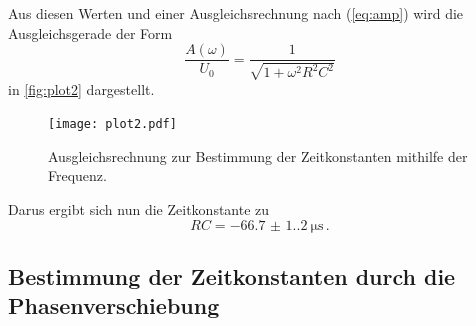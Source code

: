 Aus diesen Werten und einer Ausgleichsrechnung nach (\ref{eq:amp}) wird die Ausgleichsgerade der Form
\begin{equation*}
  \frac{A(\omega)}{U_{0}}=\frac{1}{\sqrt{1+\omega^{2} R^{2} C^{2}}}
\end{equation*}
in \autoref{fig:plot2} dargestellt.
\begin{figure}[H]
  \centering
  \texttt{[image: plot2.pdf]}
  \caption{Ausgleichsrechnung zur Bestimmung der Zeitkonstanten mithilfe der Frequenz.}
  \label{fig:plot2}
\end{figure}
Darus ergibt sich nun die Zeitkonstante zu
\begin{equation*}
  RC = \qty{-66.7(1.2)}{\micro\second} \, .
\end{equation*}


\subsection{Bestimmung der Zeitkonstanten durch die Phasenverschiebung}


